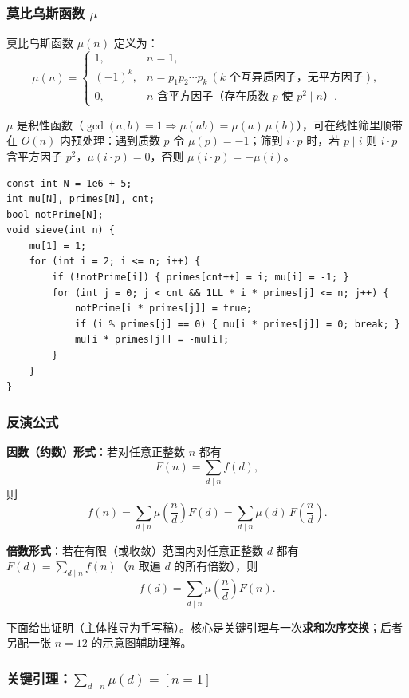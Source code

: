 	\subsubsection{莫比乌斯函数 \texorpdfstring{$\mu$}{mu}}

	莫比乌斯函数 $\mu(n)$ 定义为：
	$$
	\mu(n) =
	\begin{cases}
		1, & n = 1, \\
		(-1)^k, & n = p_1 p_2 \cdots p_k\ (\text{$k$ 个互异质因子，无平方因子}), \\
		0, & \text{$n$ 含平方因子（存在质数 $p$ 使 $p^2 \mid n$）}.
	\end{cases}
	$$

	$\mu$ 是积性函数（$\gcd(a,b)=1 \Rightarrow \mu(ab)=\mu(a)\,\mu(b)$），可在线性筛里顺带在 $O(n)$ 内预处理：遇到质数 $p$ 令 $\mu(p)=-1$；筛到 $i\cdot p$ 时，若 $p \mid i$ 则 $i\cdot p$ 含平方因子 $p^2$，$\mu(i\cdot p)=0$，否则 $\mu(i\cdot p)=-\mu(i)$。

	\begin{verbatim}
const int N = 1e6 + 5;
int mu[N], primes[N], cnt;
bool notPrime[N];
void sieve(int n) {
    mu[1] = 1;
    for (int i = 2; i <= n; i++) {
        if (!notPrime[i]) { primes[cnt++] = i; mu[i] = -1; }
        for (int j = 0; j < cnt && 1LL * i * primes[j] <= n; j++) {
            notPrime[i * primes[j]] = true;
            if (i % primes[j] == 0) { mu[i * primes[j]] = 0; break; }
            mu[i * primes[j]] = -mu[i];
        }
    }
}
	\end{verbatim}

	\subsubsection{反演公式}

	\textbf{因数（约数）形式}：若对任意正整数 $n$ 都有
	$$ F(n) = \sum_{d \mid n} f(d), $$
	则
	$$ f(n) = \sum_{d \mid n} \mu\!\left(\frac{n}{d}\right) F(d) = \sum_{d \mid n} \mu(d)\, F\!\left(\frac{n}{d}\right). $$

	\textbf{倍数形式}：若在有限（或收敛）范围内对任意正整数 $d$ 都有 $F(d) = \sum_{d \mid n} f(n)$（$n$ 取遍 $d$ 的所有倍数），则
	$$ f(d) = \sum_{d \mid n} \mu\!\left(\frac{n}{d}\right) F(n). $$

	下面给出证明（主体推导为手写稿）。核心是关键引理与一次\textbf{求和次序交换}；后者另配一张 $n=12$ 的示意图辅助理解。

	\subsubsection{关键引理：\texorpdfstring{$\sum_{d\mid n}\mu(d)=[n=1]$}{sum mu(d) = [n=1]}}

